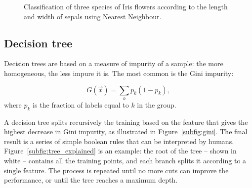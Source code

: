 \begin{figure}[htb]
	\centering
	\hfill
	\caption{Classification of three species of Iris flowers according to the length and width of sepals using Nearest Neighbour.}\label{fig:knn}
\end{figure}

\subsection{Decision tree}\label{sec:decision_tree}
Decision trees are based on a measure of impurity of a sample: the more homogeneous, the less impure it is.
The most common is the Gini impurity:

\[ G(\vec x) = \sum_k p_{k} (1-p_k),\]
where $p_k$ is the fraction of labels equal to $k$ in the group.

A decision tree splits recursively the training based on the feature that gives the highest decrease in Gini impurity, as illustrated in Figure~\ref{subfig:gini}.
The final result is a series of simple boolean rules that can be interpreted by humans.
Figure~\ref{subfig:tree_explained} is an example: the root of the tree -- shown in white -- contains all the training points, and each branch splits it according to a single feature.
The process is repeated until no more cuts can improve the performance, or until the tree reaches a maximum depth.


